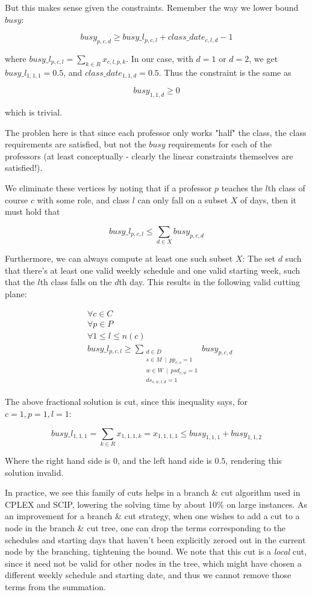 But this makes sense given the constraints. Remember the way we lower bound $busy$:

$$
busy_{p, c, d} \ge busy\_l_{p, c, l} + class\_date_{c, l, d} - 1
$$

where $busy\_l_{p, c, l} = \sum_{k \in R} x_{c, l, p, k}$. In our case, with $d = 1$ or $d = 2$, we get $busy\_l_{1, 1, 1} = 0.5$, and $class\_date_{1, 1, d} = 0.5$. Thus the constraint is the same as

$$
busy_{1, 1, d} \ge 0
$$

which is trivial.

The problen here is that since each professor only works "half" the class, the class requirements are satisfied, but not the $busy$ requirements for each of the professors (at least conceptually - clearly the linear constraints themselves are satisfied!). 

We eliminate these vertices by noting that if a professor $p$ teaches the $l$th class of course $c$ with some role, and class $l$ can only fall on a subset $X$ of days, then it must hold that

$$
busy\_l_{p, c, l} \le \sum_{d \in X} busy_{p, c, d}
$$

Furthermore, we can always compute at least one such subset $X$: The set $d$ such that there's at least one valid weekly schedule and one valid starting week, such that the $l$th class falls on the $d$th day. This results in the following valid cutting plane:

\begin{align*}
&\forall c \in C\\
&\forall p \in P\\
&\forall 1 \le l \le n(c)\\
&busy\_l_{p, c, l} \ge \sum_{\substack{d \in D \\ s \in M\ \mid\ pp_{c, s} = 1\\ w \in W\ \mid\ psd_{c, w} = 1 \\ ds_{s, w, l, d} = 1}} busy_{p, c, d}
\end{align*}

The above fractional solution is cut, since this inequality says, for $c = 1, p = 1, l = 1$:

$$
busy\_l_{1, 1, 1} = \sum_{k \in R} x_{1, 1, 1, k} = x_{1, 1, 1, 1} \le busy_{1, 1, 1} + busy_{1, 1, 2}
$$

Where the right hand side is $0$, and the left hand side is $0.5$, rendering this solution invalid.

In practice, we see this family of cuts helps in a branch \& cut algorithm used in CPLEX and SCIP, lowering the solving time by about 10\% on large instances. As an improvement for a branch \& cut strategy, when one wishes to add a cut to a node in the branch \& cut tree, one can drop the terms corresponding to the schedules and starting days that haven't been explicitly zeroed out in the current node by the branching, tightening the bound. We note that this cut is a \emph{local} cut, since it need not be valid for other nodes in the tree, which might have chosen a different weekly schedule and starting date, and thus we cannot remove those terms from the summation.
